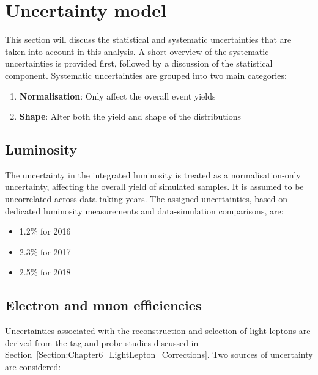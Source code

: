 \section{Uncertainty model}
\label{Section:Chapter6_Uncertainty_Model}

This section will discuss the statistical and systematic uncertainties that are taken into account in this analysis. A short overview of the systematic uncertainties is provided first, followed by a discussion of the statistical component. Systematic uncertainties are grouped into two main categories:

\begin{enumerate}[label=(\roman*)]

\item \textbf{Normalisation}: Only affect the overall event yields

\item \textbf{Shape}: Alter both the yield and shape of the distributions

\end{enumerate}

\subsection{Luminosity}

The uncertainty in the integrated luminosity is treated as a normalisation-only uncertainty, affecting the overall yield of simulated samples. It is assumed to be uncorrelated across data-taking years. The assigned uncertainties, based on dedicated luminosity measurements and data-simulation comparisons, are:

\begin{itemize}
    \item 1.2\% for 2016
    \item 2.3\% for 2017
    \item 2.5\% for 2018
\end{itemize}

\subsection{Electron and muon efficiencies}

Uncertainties associated with the reconstruction and selection of light leptons are derived from the tag-and-probe studies discussed in Section~\ref{Section:Chapter6_LightLepton_Corrections}. Two sources of uncertainty are considered:

